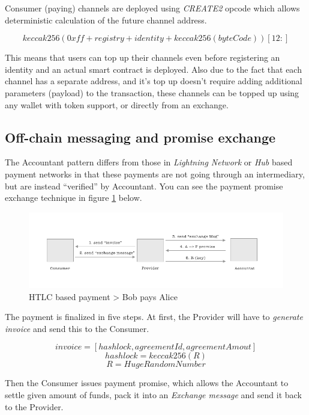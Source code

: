 \documentclass[a4paper,12pt]{article}
\begin{document}
Consumer (paying) channels are deployed using \textit{CREATE2} opcode \cite{create2}
which allows deterministic calculation of the future channel address.

\[ keccak256(0xff + registry + identity + keccak256(byteCode))[12:]\]

This means that users can top up their channels even before registering an identity 
and an actual smart contract is deployed. Also due to the fact that each channel 
has a separate address, and it’s top up doesn’t require adding additional 
parameters (payload) to the transaction, these channels can be topped up using any 
wallet with token support, or directly from an exchange.

\subsection{Off-chain messaging and promise exchange}

The Accountant pattern differs from those in \textit{Lightning Network} or 
\textit{Hub} based payment networks in that these payments are not going through 
an intermediary, but are instead “verified” by Accountant. You can see the payment 
promise exchange technique in figure \ref{img:off-chain-interactions} below.

\begin{figure}[H]
    \centering
    \includegraphics[scale=0.5]{../img/off-chain-interactions}
    \caption{HTLC based payment > Bob pays Alice}
    \label{img:off-chain-interactions}
\end{figure}

The payment is finalized in five steps. At first, the Provider will have to 
\textit{generate invoice} and send this to the Consumer.

\[ invoice = [hashlock, agreementId, agreementAmout] \]
\[ hashlock = keccak256(R) \]
\[ R = HugeRandomNumber \]

Then the Consumer issues payment promise, which allows the Accountant to settle 
given amount of funds, pack it into an \textit{Exchange message} and send it back 
to the Provider.
\end{document}
